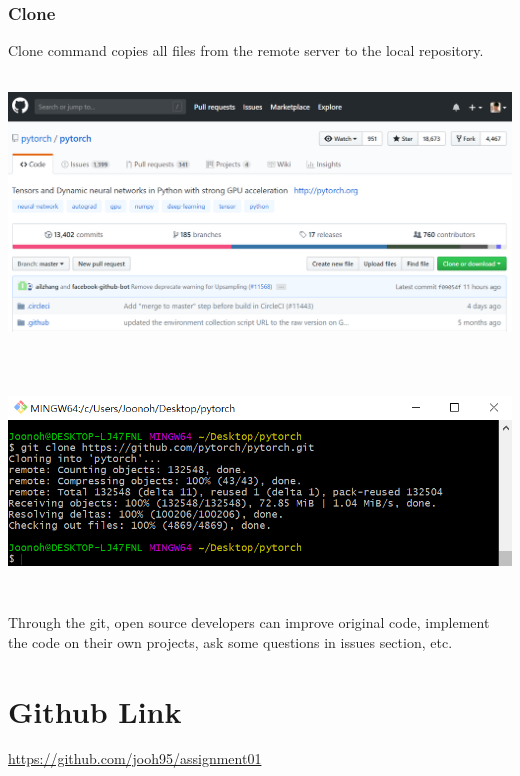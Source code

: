\documentclass[18pt]{article}%
\begin{document}
\subsubsection {Clone}
Clone command copies all files from the remote server to the local repository.\\
\includegraphics[height=8cm]{pytorch.PNG}
\includegraphics[height=6cm]{clone.PNG}



Through the git, open source developers can improve original code, implement the code on their own projects, ask some questions in issues section, etc. \\



\section{Github Link}

\href{https://github.com/jooh95/assignment01}{https://github.com/jooh95/assignment01}
\end{document}

